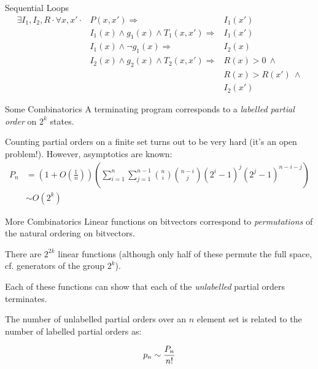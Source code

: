 \documentclass[xcolor=pdftex,t,11pt]{beamer}
\begin{document}
\begin{frame}{Sequential Loops}
\begin{align*}
\exists I_1, I_2, R \cdot \forall x, x' \cdot & P(x, x') \Rightarrow & I_1(x') \\
                                              & I_1(x) \wedge g_1(x) \wedge T_1(x, x') \Rightarrow & I_1(x') \\
                                              & I_1(x) \wedge \lnot g_1(x) \Rightarrow & I_2(x) \\
					      & I_2(x) \wedge g_2(x) \wedge T_2(x, x') \Rightarrow & R(x) > 0 ~ \wedge \\
					      & & R(x) > R(x') ~ \wedge \\
					      & & I_2(x')
\end{align*}
\end{frame}


\begin{frame}{Some Combinatorics}
A terminating program corresponds to a \emph{labelled partial order} on $2^k$ states.

\vspace{.7em}

Counting partial orders on a finite set turns out to be very hard (it's an open problem!).  However, asymptotics are known:
\begin{align*}
 P_n & = \left(1 + O \left( \frac{1}{n} \right) \right) \left( \sum_{i=1}^n \sum_{j=1}^{n-1} \binom{n}{i} \binom{n-i}{j} (2^i - 1)^j (2^j - 1)^{n - i - j}\right) \\
     & \sim O\left( 2^k \right)
\end{align*}

\end{frame}

\begin{frame}{More Combinatorics}
Linear functions on bitvectors correspond to \emph{permutations} of the natural ordering on bitvectors.

\vspace{1em}

There are $2^{2k}$ linear functions (although only half of these permute the full space, cf. generators of the group $2^k$).

\vspace{1em}

Each of these functions can show that each of the \emph{unlabelled} partial orders terminates.

The number of unlabelled partial orders over an $n$ element set is related to the number of labelled partial orders as:

$$p_n \sim {P_n \over n!}$$
\end{frame}
\end{document}

